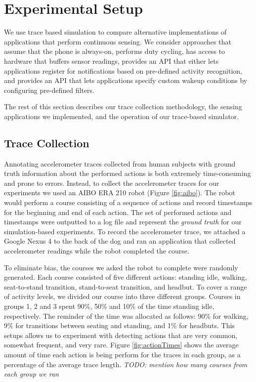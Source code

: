 \section{Experimental Setup}
\label{sec:experimentalSetup}

We use trace based simulation to compare alternative implementations
of applications that perform continuous sensing.  We consider
approaches that assume that the phone is always-on, performs duty
cycling, has access to hardware that buffers sensor readings, provides
an API that either lets applications register for notifications based
on pre-defined activity recognition, and provides an API that lets
applications specify custom wakeup conditions by configuring
pre-defined filters.

The rest of this section describes our trace
collection methodology, the sensing applications we implemented, and
the operation of our trace-based simulator.

\subsection{Trace Collection}

Annotating accelerometer traces collected from human subjects with
ground truth information about the performed actions is both extremely
time-consuming and prone to errors.  Instead, to collect the
accelerometer traces for our experiments we used an AIBO ERA 210 robot
(Figure \ref{fig:aibo}). The robot would perform a course consisting
of a sequence of actions and record timestamps for the beginning and
end of each action. The set of performed actions and timestamps were
outputted to a log file and represent the {\em ground truth} for our
simulation-based experiments.  To record the accelerometer trace, we
attached a Google Nexus 4 to the back of the dog and ran an
application that collected accelerometer readings while the robot
completed the course.

To eliminate bias, the courses we asked the robot to complete were
randomly generated.  Each course consisted of five different actions:
standing idle, walking, seat-to-stand transition, stand-to-seat
transition, and headbut.  To cover a range of activity levels, we
divided our course into three different groups.  Courses in groups 1, 2
and 3 spent 90\%, 50\% and 10\% of the time standing idle,
respectively.  The reminder of the time was allocated as follows: 90\%
for walking, 9\% for transitions between seating and standing, and 1\%
for headbuts.  This setups allows us to experiment with detecting
actions that are very common, somewhat frequent, and very rare.
Figure \ref{fig:actionTimes} shows the average amount of time each
action is being perform for the traces in each group, as a percentage
of the average trace length.  {\em TODO: mention how many courses from
  each group we ran}






